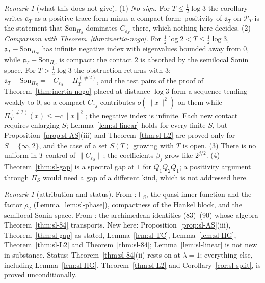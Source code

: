 \documentclass[11pt]{amsart}
\theoremstyle{definition}
\theoremstyle{remark}
\newtheorem{remark}[theorem]{Remark}
\newcommand{\PT}{\mathcal P_T}
\begin{document}
\begin{remark}[what this does not give]\label{rem:sl-not}
(1) \emph{No sign.} For $T\le\frac12\log3$ the corollary writes $\mathfrak a_T$ as a positive trace form minus a compact form; positivity of $\mathfrak a_T$ on $\PT$ is the statement that $\mathrm{Son}_{\Pi_S}$ dominates
$C_{\varepsilon_S}$ there, which nothing here decides.
(2) \emph{Comparison with Theorem~\ref{thm:inertia-nogo}.} For $\frac12\log2<T\le\frac12\log3$,
$\mathfrak a_T-\mathrm{Son}_{\Pi_\infty}$ has infinite negative index with eigenvalues bounded away from $0$, while
$\mathfrak a_T-\mathrm{Son}_{\Pi_S}$ is compact: the contact $2$ is absorbed by the semilocal Sonin
space. For $T>\frac12\log3$ the obstruction returns with $3$: $\mathfrak a_T-\mathrm{Son}_{\Pi_S}=-C_{\varepsilon_S}+\Pi^{(\ne2)}_T$, and
the test pairs of the proof of Theorem~\ref{thm:inertia-nogo} placed at distance $\log3$ form a sequence tending weakly
to $0$, so a compact $C_{\varepsilon_S}$ contributes $o(\|x\|^2)$ on them while $\Pi^{(\ne2)}_T(x)\le-c\|x\|^2$; the negative index is
infinite. Each new contact requires enlarging $S$; Lemma~\ref{lem:sl-linear} holds for every finite $S$, but
Proposition~\ref{prop:sl-AS}(iii) and Theorem~\ref{thm:sl-L2} are proved only for $S=\{\infty,2\}$, and the case of a
set $S(T)$ growing with $T$ is open.
(3) There is no uniform-in-$T$ control of $\|C_{\varepsilon_S}\|$; the coefficients $\beta_j$ grow like $2^{j/2}$.
(4) Theorem~\ref{thm:sl-gap} is a spectral gap at $1$ for $Q_1Q_2Q_1$; a positivity argument through $\Pi_S$ would
need a gap of a different kind, which is not addressed here.
\end{remark}

\begin{remark}[attribution and status]\label{rem:sl-new}
From \cite{CCquasi2020,CCM2023,CCM2024}: $\mathsf F_S$, the quasi-inner function and the factor $\rho_2$
(Lemma~\ref{lem:sl-phase}), compactness of the Hankel block, and the semilocal Sonin space. From
\cite{ConnesConsani2021}: the archimedean identities (83)--(90) whose algebra Theorem~\ref{thm:sl-84} transports.
New here: Proposition~\ref{prop:sl-AS}(iii), Theorem~\ref{thm:sl-gap} as stated, Lemma~\ref{lem:sl-TC},
Lemma~\ref{lem:sl-HG}, Theorem~\ref{thm:sl-L2} and Theorem~\ref{thm:sl-84}; Lemma~\ref{lem:sl-linear} is not new in
substance. Status: Theorem~\ref{thm:sl-84}(ii) rests on \cite[Thm.~4.7]{ConnesConsani2021} at $\lambda=1$; everything
else, including Lemma~\ref{lem:sl-HG}, Theorem~\ref{thm:sl-L2} and Corollary~\ref{cor:sl-split}, is proved
unconditionally.
\end{remark}
\end{document}
